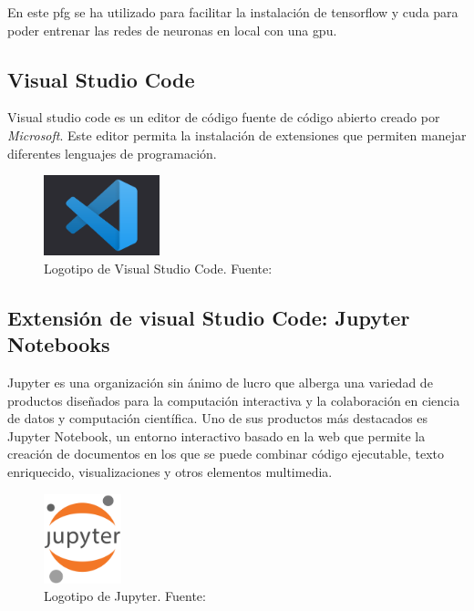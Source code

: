 En este \gls{pfg} se ha utilizado para facilitar la instalación de tensorflow y cuda para poder entrenar las redes de neuronas en local con una \gls{gpu}.

\subsection{Visual Studio Code}

Visual studio code es un editor de código fuente de código abierto creado por \textit{Microsoft}. Este editor permita la instalación de extensiones que permiten manejar diferentes lenguajes de programación.

\begin{figure}[H]
	\centering
	\includegraphics[width=0.3\textwidth]{figures/vsc.png}
	\caption{\label{fig:vscodeicon}Logotipo de Visual Studio Code. Fuente: \cite{vscodeicon}}
\end{figure}

\subsection{Extensión de visual Studio Code: Jupyter Notebooks}

Jupyter es una organización sin ánimo de lucro que alberga una variedad de productos diseñados para la computación interactiva y la colaboración en ciencia de datos y computación científica. Uno de sus productos más destacados es Jupyter Notebook, un entorno interactivo basado en la web que permite la creación de documentos en los que se puede combinar código ejecutable, texto enriquecido, visualizaciones y otros elementos multimedia.

\begin{figure}[H]
	\centering
	\includegraphics[width=0.2\textwidth]{figures/jupyterlogo.jpg}
	\caption{\label{fig:jupyterlogo}Logotipo de Jupyter. Fuente: \cite{jupyter_wikipedia}}
\end{figure}


